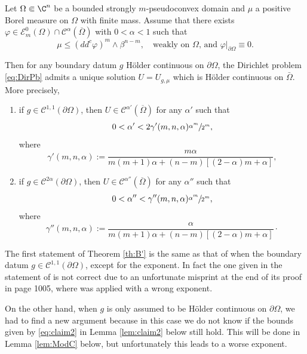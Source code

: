 \begin{theoremB}\label{th:B'}
Let $\Omega \Subset \C^n$ be a bounded strongly $m$-pseudoconvex domain and $\mu $ a positive Borel measure on $\Omega$ with finite mass. Assume that there exists \hbox{$\varphi\in \mathcal{E}^0_m(\Omega)\cap\mathcal{C}^{\alpha}(\overline\Omega)$} with $0 < \alpha < 1$ such that
\begin{equation} \label{eq:subsol}
\mu \leq (dd^c\varphi)^m\wedge\beta^{n-m}, \quad \text{weakly on $\Omega$, and $\varphi|_{\partial \Omega} \equiv 0$.}
\end{equation}

Then for any boundary datum $g $ Hölder continuous on $\partial \Omega$, the Dirichlet problem \eqref{eq:DirPb} admits a unique solution $U = U_{g,\mu} $ which is Hölder continuous on $\bar{\Omega}$.
More precisely,
\begin{enumerate}
\item
if $g \in \mathcal C^{1,1} (\partial \Omega)$, then $ U \in \mathcal{C}^{\alpha'}(\overline\Omega)$ for any $\alpha'$ such that
\[
0 < \alpha' < 2 \gamma' (m,n,\alpha) \sfrac{\alpha^m}{2^{m}},
\]
where
\begin{equation} \label{eq:gamma'}
\gamma' (m,n,\alpha) := \frac{ m \alpha}{ m (m + 1) \alpha + (n-m) [(2 - \alpha)m + \alpha]},
\end{equation}

\item
if $g \in \mathcal C^{2 \alpha} (\partial \Omega)$, then $ U \in \mathcal{C}^{\alpha''}(\overline\Omega)$ for any $\alpha''$ such that
\[
0 < \alpha'' < \gamma'' (m,n,\alpha) \sfrac{\alpha^m}{2^{m}},
\]
where
\begin{equation} \label{eq:gamma''}
\gamma'' (m,n,\alpha) := \frac{\alpha}{ m (m + 1) \alpha + (n-m) [(2 - \alpha)m + \alpha]}\cdot
\end{equation}
\end{enumerate}
\end{theoremB}

The first statement of Theorem \ref{th:B'} is the same as that of \cite[Th.\,B]{BZ20} when the boundary datum $g \in \mathcal C^{1,1} (\partial \Omega)$, except for the exponent.
In fact the one given in the statement of \cite[Th.\,B]{BZ20} is not correct due to an unfortunate misprint at the end of its proof in page 1005, where \cite[Prop.\,2.20]{BZ20} was applied with a wrong exponent.

On the other hand, when $g$ is only assumed to be Hölder continuous on $\partial \Omega$, we had to find a new argument because in this case we do not know if the bounds given by \eqref{eq:claim2} in Lemma \ref{lem:claim2} below still hold. This will be done in Lemma \ref{lem:ModC} below, but unfortunately this leads to a worse exponent.

